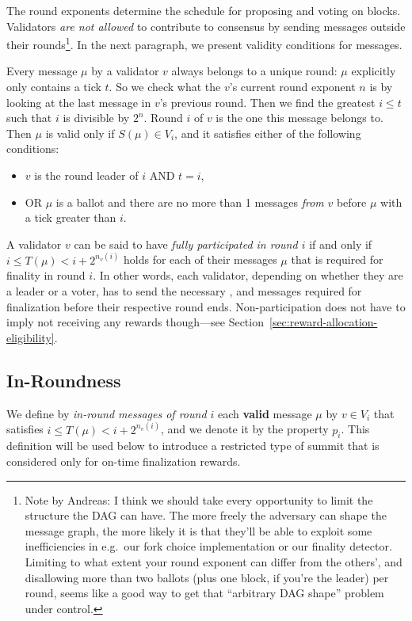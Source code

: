 The round exponents determine the schedule for proposing and voting on blocks. Validators \emph{are not allowed} to contribute to consensus by sending messages outside their rounds\footnote{Note by Andreas: I think we should take every opportunity to limit the structure the DAG can have. The more freely the adversary can shape the message graph, the more likely it is that they'll be able to exploit some inefficiencies in e.g.~our fork choice implementation or our finality detector. Limiting to what extent your round exponent can differ from the others', and disallowing more than two ballots (plus one block, if you're the leader) per round, seems like a good way to get that ``arbitrary DAG shape'' problem under control.}. In the next paragraph, we present validity conditions for messages.

Every message $\mu$ by a validator $v$ always belongs to a unique round: $\mu$ explicitly only contains a tick $t$. So we check what the $v$'s current round exponent $n$ is by looking at the last message in $v$'s previous round. Then we find the greatest $i\leq t$ such that $i$ is divisible by $2^n$. Round $i$ of $v$ is the one this message belongs to. Then $\mu$ is valid only if $S(\mu)\in V_i$, and it satisfies either of the following conditions:

\begin{itemize}
\item
  $v$ is the round leader of $i$ AND $t = i$,
\item
  OR $\mu$ is a ballot and there are no more than 1 messages
  \emph{from} $v$ before $\mu$ with a tick greater than $i$.
\end{itemize}

A validator $v$ can be said to have \emph{fully participated in round $i$} if and only if $i \leq T(\mu) <i+2^{n_v(i)}$ holds for each of their messages $\mu$ that is required for finality in round $i$. In other words, each validator, depending on whether they are a leader or a voter, has to send the necessary \PROP, \CONF and \WIT messages required for finalization before their respective round ends. Non-participation does not have to imply not receiving any rewards though---see Section~\ref{sec:reward-allocation-eligibility}.

\subsection{In-Roundness}
\label{sec:in-roundness}

We define by \emph{in-round messages of round $i$} each \textbf{valid} message $\mu$ by $v\in V_i$ that satisfies $i \leq T(\mu)< i+2^{n_v(i)}$, and we denote it by the property $p_i$. This definition will be used below to introduce a restricted type of summit that is considered only for on-time finalization rewards.


